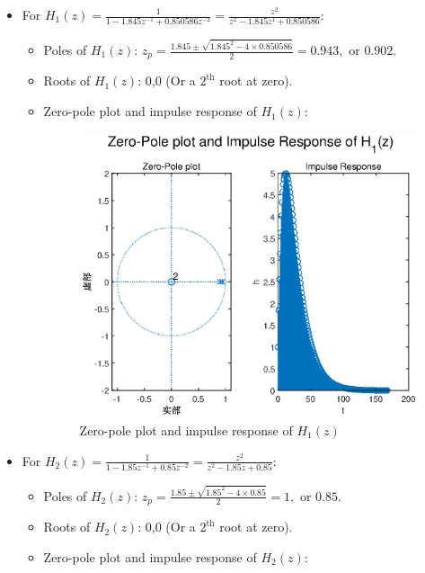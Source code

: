 \documentclass[onecolumn,oneside]{SUSTechHomework}
\begin{document}
\begin{itemize}
    \item For $H_1(z)=\frac{1}{1-1.845 z^{-1}+0.850586 z^{-2}}=\frac{z^2}{z^{2}-1.845 z^{1}+0.850586}$:
    \begin{itemize}
        \item Poles of $H_1(z)$: $z_{p}=\frac{1.845 \pm \sqrt{1.845^{2}-4 \times 0.850586}}{2}=0.943, \text { or } 0.902$.
        \item Roots of $H_1(z)$: 0,0 (Or a $2^{\text{th}}$ root at zero).
        \item Zero-pole plot and impulse response of $H_1(z)$: 
        \begin{figure}[H]
            \centering
            \includegraphics[width=170mm]{pictures/q6_2_5(a).eps}
            \caption{Zero-pole plot and impulse response of $H_1(z)$}
        \end{figure}
    \end{itemize}
    \item For $H_2(z)=\frac{1}{1-1.85 z^{-1}+0.85 z^{-2}}=\frac{z^{2}}{z^{2}-1.85z+0.85}$:
    \begin{itemize}
        \item Poles of $H_2(z)$: $z_{p}=\frac{1.85 \pm \sqrt{1.85^{2}-4 \times 0.85}}{2}=1, \text { or } 0.85$.
        \item Roots of $H_2(z)$: 0,0 (Or a $2^{\text{th}}$ root at zero).
        \item Zero-pole plot and impulse response of $H_2(z)$:
        \begin{figure}[H]

\end{figure}
\end{itemize}
\end{itemize}
\end{document}
